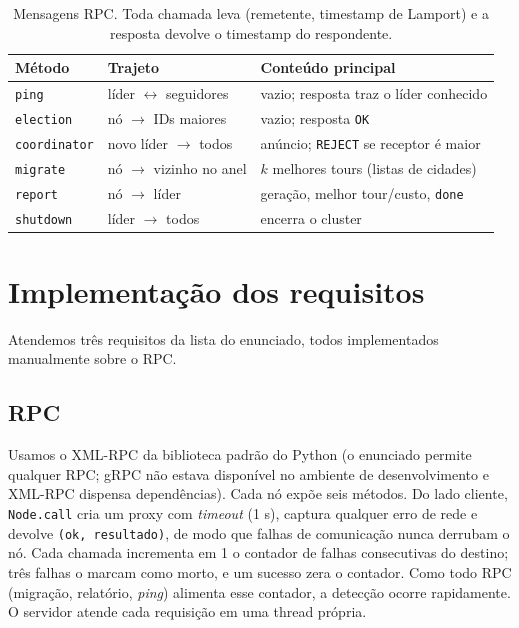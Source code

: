 \documentclass[12pt]{article}
\newcommand{\code}[1]{\texttt{\small #1}}
\begin{document}
\begin{table}[h]
\centering\small
\caption{Mensagens RPC. Toda chamada leva (remetente, timestamp de Lamport) e a resposta devolve o timestamp do respondente.}
\label{tab:msg}
\begin{tabular}{@{}lll@{}}
\toprule
Método & Trajeto & Conteúdo principal \\ \midrule
\code{ping} & líder $\leftrightarrow$ seguidores & vazio; resposta traz o líder conhecido \\
\code{election} & nó $\to$ IDs maiores & vazio; resposta \code{OK} \\
\code{coordinator} & novo líder $\to$ todos & anúncio; \code{REJECT} se receptor é maior \\
\code{migrate} & nó $\to$ vizinho no anel & $k$ melhores tours (listas de cidades) \\
\code{report} & nó $\to$ líder & geração, melhor tour/custo, \code{done} \\
\code{shutdown} & líder $\to$ todos & encerra o cluster \\ \bottomrule
\end{tabular}
\end{table}

\section{Implementação dos requisitos}
Atendemos três requisitos da lista do enunciado, todos implementados manualmente sobre o RPC.

\subsection{RPC}
Usamos o XML-RPC da biblioteca padrão do Python (o enunciado permite qualquer RPC; gRPC não estava disponível no ambiente de desenvolvimento e XML-RPC dispensa dependências). Cada nó expõe seis métodos. Do lado cliente, \code{Node.call} cria um proxy com \textit{timeout} (1 s), captura qualquer erro de rede e devolve \code{(ok, resultado)}, de modo que falhas de comunicação nunca derrubam o nó. Cada chamada incrementa em 1 o contador de falhas consecutivas do destino; três falhas o marcam como morto, e um sucesso zera o contador. Como todo RPC (migração, relatório, \textit{ping}) alimenta esse contador, a detecção ocorre rapidamente. O servidor atende cada requisição em uma thread própria.
\end{document}
